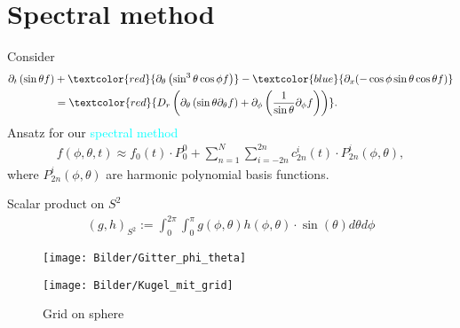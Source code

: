\section{Spectral method}
\begin{frame}
	\scriptsize
	Consider
\begin{align}
	\partial_{t}\left(\sin \theta f\right) &+ \textcolor{red}{\partial_\theta\left( \sin ^3 \theta \cos \phi f\right)} - \textcolor{blue}{\partial_x(-\cos\phi \sin\theta \cos\theta f)} \\
	&= \textcolor{red}{D_{r}\left(\partial_\theta \left(\sin \theta \partial_\theta f\right)+ \partial_\phi\left(\frac{1}{\sin \theta} \partial_\phi f\right)\right)}. \nonumber 
\end{align}
	\vspace{12pt}
    \pause
     Ansatz for our \textcolor{cyan}{spectral method}
\begin{align}
	f(\phi, \theta, t) \approx f_0(t) \cdot P_0^0 + \sum_{n=1}^{N} \sum_{i=-2n}^{2n} c^i_{2n}(t) \cdot P^i_{2n}(\phi, \theta), \label{ansatz}
\end{align}
    where $P^i_{2n}(\phi, \theta)$ are harmonic polynomial basis functions. 
\end{frame}



\begin{frame}
	Scalar product on $S^2$
	\begin{align*}
		(g,h)_{S^2} := \int_{0}^{2\pi} \int_{0}^{\pi} g(\phi, \theta) h(\phi, \theta) \cdot \sin(\theta) d\theta d\phi
	\end{align*}
	
	\begin{figure}
		\small
		\begin{minipage}{0.46\textwidth}
			\texttt{[image: Bilder/Gitter\_phi\_theta]}
		\end{minipage}
		\hfill 
		\begin{minipage}{0.5\textwidth}
			\texttt{[image: Bilder/Kugel\_mit\_grid]}
		\end{minipage}
		\caption{Grid on sphere}
	\end{figure}
\end{frame}



